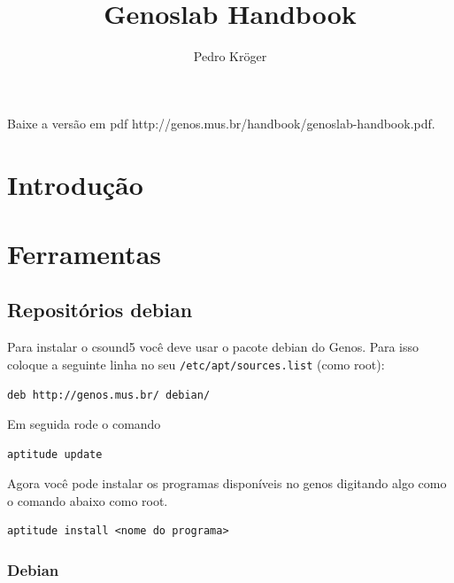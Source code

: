 \documentclass[12pt,brazil]{book}
\title{Genoslab Handbook}
\author{Pedro Kröger}
\begin{document}
\graphicspath{{figs/}}

\maketitle

\begin{htmlonly}
  Baixe a versão em pdf 
  {http://genos.mus.br/handbook/genoslab-handbook.pdf}.
\end{htmlonly}

\tableofcontents

\part{Introdução}
\label{part:introducao}


\part{Ferramentas}
\label{part:ferramentas}

\chapter{Repositórios debian}
\label{cha:repositorios-debian}

Para instalar o csound5 você deve usar o pacote debian do Genos. Para
isso coloque a seguinte linha no seu \texttt{/etc/apt/sources.list}
(como root):

\begin{verbatim}
deb http://genos.mus.br/ debian/
\end{verbatim}

Em seguida rode o comando

\begin{verbatim}
aptitude update
\end{verbatim}

Agora você pode instalar os programas disponíveis no genos digitando
algo como o comando abaixo como root.

\begin{verbatim}
aptitude install <nome do programa>
\end{verbatim}

\section{Debian}
\label{sec:debian}
\end{document}
